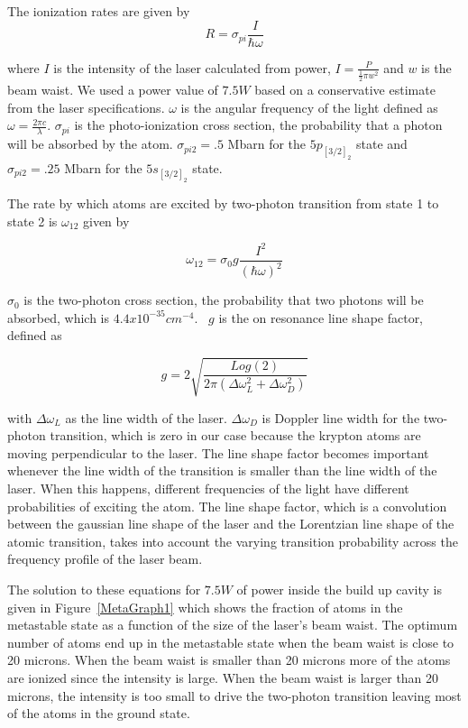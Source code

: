 \documentclass[prb,preprint]{revtex4-1}
\begin{document}
The ionization rates are given by 
\begin{equation}
\label{IonizationRates}
R = \sigma_{pi} \frac{I}{\hbar\omega}
\end{equation}

where $I$ is the intensity of the laser calculated from power, $I = \frac{P}{\frac{1}{2}\pi w^2}$ and $w$ is the beam waist. We used a power value of $7.5 W$ based on a conservative estimate from the laser specifications. $\omega$ is the angular frequency of the light defined as $\omega = \frac{2\pi c}{\lambda}$. $\sigma_{pi}$ is the photo-ionization cross section, the probability that a photon will be absorbed by the atom. $\sigma_{pi2} = .5$ Mbarn for the $5p_{[3/2]_2}$ state and $\sigma_{pi2} = .25$ Mbarn for the $5s_{[3/2]_2}$ state.~\cite{Cannon}

The rate by which atoms are excited by two-photon transition from state 1 to state 2 is $\omega_{12}$ given by

\begin{equation}
\label{ExcitationRate}
\omega_{12} = \sigma_0 g \frac{I^2}{(\hbar \omega)^2}
\end{equation}

$\sigma_0$ is the two-photon cross section, the probability that two photons will be absorbed, which is $4.4x10^{-35} cm^{-4}$.~\cite{NIST} $g$ is the on resonance line shape factor, defined as 

\begin{equation}
\label{LineShapeFactor}
g = 2 \sqrt{\frac{Log(2)}{2 \pi (\Delta \omega_L^2 + \Delta \omega_D^2)}}
\end{equation}

with $\Delta\omega_L$ as the line width of the laser. $\Delta \omega_D$ is Doppler line width for the two-photon transition, which is zero in our case because the krypton atoms are moving perpendicular to the laser.  The line shape factor becomes important whenever the line width of the transition is smaller than the line width of the laser.  When this happens, different frequencies of the light have different probabilities of exciting the atom.  The line shape factor, which is a convolution between the gaussian line shape of the laser and the Lorentzian line shape of the atomic transition, takes into account the varying transition probability across the frequency profile of the laser beam. 

The solution to these equations for $7.5 W$ of power inside the build up cavity is given in Figure~\ref{MetaGraph1} which shows the fraction of atoms in the metastable state as a function of the size of the laser's beam waist. The optimum number of atoms end up in the metastable state when the beam waist is close to 20 microns. When the beam waist is smaller than 20 microns more of the atoms are ionized since the intensity is large. When the beam waist is larger than 20 microns, the intensity is too small to drive the two-photon transition leaving most of the atoms in the ground state.
\end{document}
